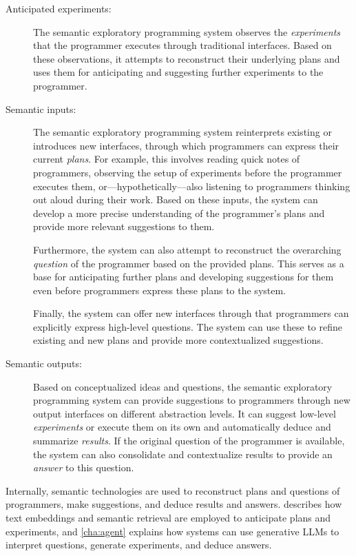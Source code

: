 \begin{description}
	\item[Anticipated experiments:]
	The semantic exploratory programming system observes the \emph{experiments} that the programmer executes through traditional interfaces.
	Based on these observations, it attempts to reconstruct their underlying plans and uses them for anticipating and suggesting further experiments to the programmer.

	\item[Semantic inputs:]
	The semantic exploratory programming system reinterprets existing or introduces new interfaces, through which programmers can express their current \emph{plans}.
	For example, this involves reading quick notes of programmers, observing the setup of experiments before the programmer executes them, or---hypothetically---also listening to programmers thinking out aloud during their work.
	Based on these inputs, the system can develop a more precise understanding of the programmer's plans and provide more relevant suggestions to them.

	Furthermore, the system can also attempt to reconstruct the overarching \emph{question} of the programmer based on the provided plans.
	This serves as a base for anticipating further plans and developing suggestions for them even before programmers express these plans to the system.

	Finally, the system can offer new interfaces through that programmers can explicitly express high-level questions.
	The system can use these to refine existing and new plans and provide more contextualized suggestions.

	\item[Semantic outputs:]
	Based on conceptualized ideas and questions, the semantic exploratory programming system can provide suggestions to programmers through new output interfaces on different abstraction levels.
	It can suggest low-level \emph{experiments} or execute them on its own and automatically deduce and summarize \emph{results}.
	If the original question of the programmer is available, the system can also consolidate and contextualize results to provide an \emph{answer} to this question.
\end{description}

Internally, semantic technologies are used to reconstruct plans and questions of programmers, make suggestions, and deduce results and answers.
 describes how text embeddings and semantic retrieval are employed to anticipate plans and experiments, and \cref{cha:agent} explains how systems can use generative LLMs to interpret questions, generate experiments, and deduce answers.
